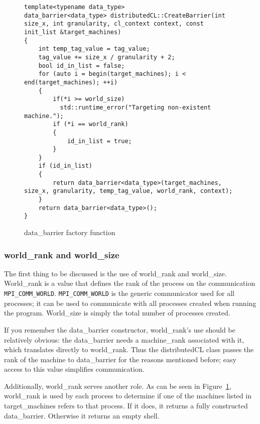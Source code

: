 \documentclass[../thesis.tex]{subfiles}
\begin{document}
    \begin{figure}[htbp]
        \centering
        \lstset{language=cpp}
        \begin{lstlisting}[tabsize=2]
template<typename data_type>
data_barrier<data_type> distributedCL::CreateBarrier(int size_x, int granularity, cl_context context, const init_list &target_machines)
{
    int temp_tag_value = tag_value;
    tag_value += size_x / granularity + 2;
    bool id_in_list = false;
    for (auto i = begin(target_machines); i < end(target_machines); ++i)
    {
        if(*i >= world_size)
          std::runtime_error("Targeting non-existent machine.");
        if (*i == world_rank)
        {
            id_in_list = true;
        }
    }
    if (id_in_list)
    {
        return data_barrier<data_type>(target_machines, size_x, granularity, temp_tag_value, world_rank, context);
    }
    return data_barrier<data_type>();
}
        \end{lstlisting}
        \caption{data\_barrier factory function}
        \label{fig:createbarrier_function}
    \end{figure}

    \subsubsection{world\_rank and world\_size} %
    \label{ssub:world_rank_and_world_size}
        The first thing to be discussed is the use of world\_rank and world\_size. World\_rank is a value that defines the rank of the process on the communication \texttt{MPI\_COMM\_WORLD}. \texttt{MPI\_COMM\_WORLD} is the generic communicator used for all processes; it can be used to communicate with all processes created when running the program. World\_size is simply the total number of processes created.

        If you remember the data\_barrier constructor, world\_rank's use should be relatively obvious: the data\_barrier needs a machine\_rank associated with it, which translates directly to world\_rank. Thus the distributedCL class passes the rank of the machine to data\_barrier for the reasons mentioned before; easy access to this value simplifies communication.

        Additionally, world\_rank serves another role. As can be seen in Figure~\ref{fig:createbarrier_function}, world\_rank is used by each process to determine if one of the machines listed in target\_machines refers to that process. If it does, it returns a fully constructed data\_barrier. Otherwise it returns an empty shell.
\end{document}
